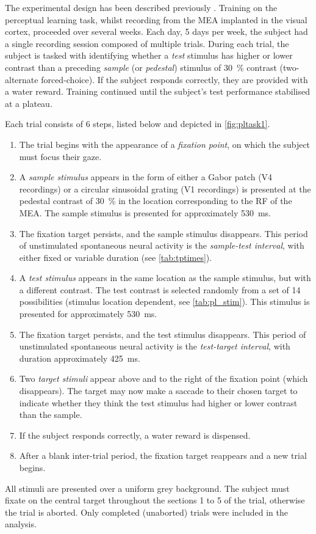 The experimental design has been described previously \citep[see][]{Chen2013}.
Training on the perceptual learning task, whilst recording from the \ac{MEA} implanted in the visual cortex, proceeded over several weeks.
Each day, 5 days per week, the subject had a single recording session composed of multiple trials.
During each trial, the subject is tasked with identifying whether a \textit{test} stimulus has higher or lower contrast than a preceding \textit{sample} (or \textit{pedestal}) stimulus of \SI{30}{\percent} contrast (two-alternate forced-choice).
If the subject responds correctly, they are provided with a water reward.
Training continued until the subject's test performance stabilised at a plateau.

Each trial consists of 6 steps, listed below and depicted in \autoref{fig:pltask1}.
\begin{enumerate}
\item The trial begins with the appearance of a \textit{fixation point}, on which the subject must focus their gaze.
\item A \textit{sample stimulus} appears in the form of either a Gabor patch (\ac{V4} recordings) or a circular sinusoidal grating (\ac{V1} recordings) is presented at the pedestal contrast of \SI{30}{\percent} in the location corresponding to the \ac{RF} of the \ac{MEA}.
The sample stimulus is presented for approximately \SI{530}{\milli\second}.
\item The fixation target persists, and the sample stimulus disappears.
This period of unstimulated spontaneous neural activity is the \textit{sample-test interval}, with either fixed or variable duration (see \autoref{tab:tptimes}).
\item A \textit{test stimulus} appears in the same location as the sample stimulus, but with a different contrast.
The test contrast is selected randomly from a set of 14 possibilities (stimulus location dependent, see \autoref{tab:pl_stim}).
This stimulus is presented for approximately \SI{530}{\milli\second}.
\item The fixation target persists, and the test stimulus disappears.
This period of unstimulated spontaneous neural activity is the \textit{test-target interval}, with duration approximately \SI{425}{\milli\second}.
\item Two \textit{target stimuli} appear above and to the right of the fixation point (which disappears).
The target may now make a saccade to their chosen target to indicate whether they think the test stimulus had higher or lower contrast than the sample.
\item If the subject responds correctly, a water reward is dispensed.
\item After a blank inter-trial period, the fixation target reappears and a new trial begins.
\end{enumerate}
All stimuli are presented over a uniform grey background.
The subject must fixate on the central target throughout the sections 1 to 5 of the trial, otherwise the trial is aborted.
Only completed (unaborted) trials were included in the analysis.


